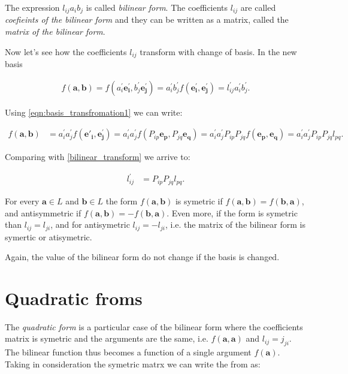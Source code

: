 \documentclass{book}
\begin{document}
The expression $l_{ij}a_{i}b_{j}$ is called \emph{bilinear form}. The coefficients $l_{ij}$ are called \emph{coefieints of the bilinear form} and they can be written as a matrix, called the \emph{matrix of the bilinear form}.

Now let's see how the coefficients $l_{ij}$ transform with change of basis. In the new basis

\begin{align}
f(\boldsymbol{a}, \boldsymbol{b})
= f (a^{'}_i\boldsymbol{e^{'}_i}, b^{'}_j\boldsymbol{e^{'}_j})
= a^{'}_i b^{'}_j f(\boldsymbol{e^{'}_i}, \boldsymbol{e^{'}_j})
= l^{'}_{ij} a^{'}_i b^{'}_j  . \label{bilinear_transform}
\end{align}

Using \eqref{eqn:basis_transfromation1} we can write:

\begin{align*}
f(\boldsymbol{a}, \boldsymbol{b}) &= a^{'}_i a^{'}_j f(\boldsymbol{e{'}_i}, \boldsymbol{e^{'}_j})
= a^{'}_i a^{'}_j f(P_{ip}\boldsymbol{e_p}, P_{jq}\boldsymbol{e_q})
= a^{'}_i a^{'}_j P_{ip}P_{jq} f(\boldsymbol{e_p}, \boldsymbol{e_q})
= a^{'}_i a^{'}_j P_{ip}P_{jq} l_{pq}.
\end{align*}

Comparing with \eqref{bilinear_transform} we arrive to:

\begin{align}
l^{'}_{ij} &= P_{ip}P_{jq} l_{pq} . \label{bilinear_transform1}
\end{align}

For every $\boldsymbol{a} \in L$ and $\boldsymbol{b} \in L$ the form $f(\boldsymbol{a}, \boldsymbol{b})$ is symetric if $f(\boldsymbol{a}, \boldsymbol{b}) = f(\boldsymbol{b}, \boldsymbol{a})$, and antisymmetric if $f(\boldsymbol{a}, \boldsymbol{b}) = -f(\boldsymbol{b}, \boldsymbol{a})$.
Even more, if the form is symetric than $l_{ij} = l_{ji}$, and for antisymetric  $l_{ij} = -l_{ji}$, i.e. the matrix of the bilinear form is symertic or atisymetric.

Again, the value of the bilinear form do not change if the basis is changed.

\section{Quadratic froms}

The \emph{quadratic form} is a particular case of the bilinear form where the coefficients matrix is symetric and the arguments are the same, i.e. $f(\boldsymbol{a}, \boldsymbol{a})$ and $l_{ij} = j_{ji}$. The bilinear function thus becomes a function of a single argument $f(\boldsymbol{a})$. Taking in consideration the symetric matrx we can write the from as:
\end{document}
